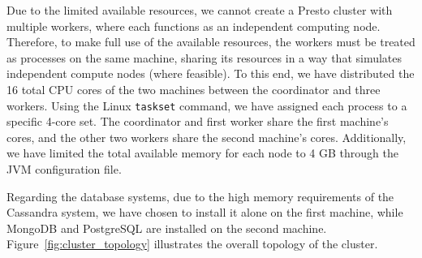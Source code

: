 \documentclass[conference]{IEEEtran}
\begin{document}
Due to the limited available resources, we cannot create a Presto cluster with multiple workers, where each functions as an independent computing node. Therefore, to make full use of the available resources, the workers must be treated as processes on the same machine, sharing its resources in a way that simulates independent compute nodes (where feasible). To this end, we have distributed the 16 total CPU cores of the two machines between the coordinator and three workers. Using the Linux \texttt{taskset} command, we have assigned each process to a specific 4-core set. The coordinator and first worker share the first machine's cores, and the other two workers share the second machine's cores. Additionally, we have limited the total available memory for each node to 4 GB through the JVM configuration file.

Regarding the database systems, due to the high memory requirements of the Cassandra system, we have chosen to install it alone on the first machine, while MongoDB and PostgreSQL are installed on the second machine. Figure~\ref{fig:cluster_topology} illustrates the overall topology of the cluster.
\end{document}
